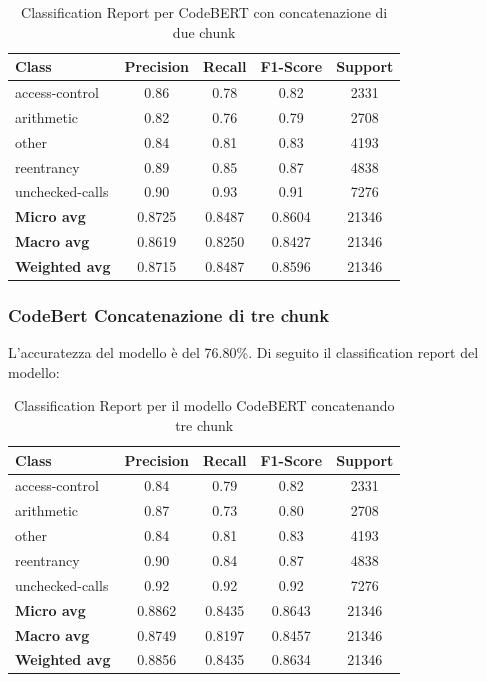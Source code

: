 \documentclass[../../Thesis.tex]{subfiles}
\begin{document}
\begin{table}[H]
    \centering
    \small
    \begin{tabular}{lcccc}
    \hline
    \textbf{Class} & \textbf{Precision} & \textbf{Recall} & \textbf{F1-Score} & \textbf{Support} \\
    \hline
    access-control & 0.86 & 0.78 & 0.82 & 2331 \\
    arithmetic & 0.82 & 0.76 & 0.79 & 2708 \\
    other & 0.84 & 0.81 & 0.83 & 4193 \\
    reentrancy & 0.89 & 0.85 & 0.87 & 4838 \\
    unchecked-calls & 0.90 & 0.93 & 0.91 & 7276 \\
    \hline
    \textbf{Micro avg} & 0.8725 & 0.8487 & 0.8604 & 21346 \\
    \textbf{Macro avg} & 0.8619 & 0.8250 & 0.8427 & 21346 \\
    \textbf{Weighted avg} & 0.8715 & 0.8487 & 0.8596 & 21346 \\
    \hline
    \end{tabular}
    \caption{Classification Report per CodeBERT con concatenazione di due chunk}
    \end{table}
\subsubsection{CodeBert Concatenazione di tre chunk}
L'accuratezza del modello \`e del 76.80\%. Di seguito il classification report del modello:

\begin{table}[H]
    \centering
    \small
    \begin{tabular}{lcccc}
    \hline
    \textbf{Class} & \textbf{Precision} & \textbf{Recall} & \textbf{F1-Score} & \textbf{Support} \\
    \hline
    access-control & 0.84 & 0.79 & 0.82 & 2331 \\
    arithmetic & 0.87 & 0.73 & 0.80 & 2708 \\
    other & 0.84 & 0.81 & 0.83 & 4193 \\
    reentrancy & 0.90 & 0.84 & 0.87 & 4838 \\
    unchecked-calls & 0.92 & 0.92 & 0.92 & 7276 \\
    \hline
    \textbf{Micro avg} & 0.8862 & 0.8435 & 0.8643 & 21346 \\
    \textbf{Macro avg} & 0.8749 & 0.8197 & 0.8457 & 21346 \\
    \textbf{Weighted avg} & 0.8856 & 0.8435 & 0.8634 & 21346 \\
    \hline
    \end{tabular}
    \caption{Classification Report per il modello CodeBERT concatenando tre chunk}
\end{table}
\end{document}

